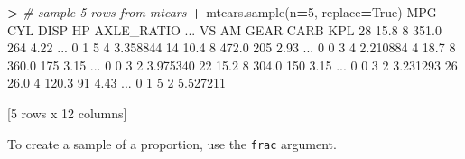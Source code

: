 \documentclass[
]{book}
\newenvironment{Shaded}{\begin{snugshade}}{\end{snugshade}}
\newcommand{\CommentTok}[1]{\textcolor[rgb]{0.56,0.35,0.01}{\textit{#1}}}
\newcommand{\DecValTok}[1]{\textcolor[rgb]{0.00,0.00,0.81}{#1}}
\newcommand{\FloatTok}[1]{\textcolor[rgb]{0.00,0.00,0.81}{#1}}
\newcommand{\NormalTok}[1]{#1}
\newcommand{\OperatorTok}[1]{\textcolor[rgb]{0.81,0.36,0.00}{\textbf{#1}}}
\newcommand{\VariableTok}[1]{\textcolor[rgb]{0.00,0.00,0.00}{#1}}
\begin{document}
\begin{Shaded}
\begin{Highlighting}[]
\OperatorTok{\textgreater{}} \CommentTok{\# sample 5 rows from mtcars}
\OperatorTok{+}\NormalTok{ mtcars.sample(n}\OperatorTok{=}\DecValTok{5}\NormalTok{, replace}\OperatorTok{=}\VariableTok{True}\NormalTok{)}
\NormalTok{     MPG  CYL   DISP   HP  AXLE\_RATIO  ...  VS  AM  GEAR CARB       KPL}
\DecValTok{28}  \FloatTok{15.8}    \DecValTok{8}  \FloatTok{351.0}  \DecValTok{264}        \FloatTok{4.22}\NormalTok{  ...   }\DecValTok{0}   \DecValTok{1}     \DecValTok{5}    \DecValTok{4}  \FloatTok{3.358844}
\DecValTok{14}  \FloatTok{10.4}    \DecValTok{8}  \FloatTok{472.0}  \DecValTok{205}        \FloatTok{2.93}\NormalTok{  ...   }\DecValTok{0}   \DecValTok{0}     \DecValTok{3}    \DecValTok{4}  \FloatTok{2.210884}
\DecValTok{4}   \FloatTok{18.7}    \DecValTok{8}  \FloatTok{360.0}  \DecValTok{175}        \FloatTok{3.15}\NormalTok{  ...   }\DecValTok{0}   \DecValTok{0}     \DecValTok{3}    \DecValTok{2}  \FloatTok{3.975340}
\DecValTok{22}  \FloatTok{15.2}    \DecValTok{8}  \FloatTok{304.0}  \DecValTok{150}        \FloatTok{3.15}\NormalTok{  ...   }\DecValTok{0}   \DecValTok{0}     \DecValTok{3}    \DecValTok{2}  \FloatTok{3.231293}
\DecValTok{26}  \FloatTok{26.0}    \DecValTok{4}  \FloatTok{120.3}   \DecValTok{91}        \FloatTok{4.43}\NormalTok{  ...   }\DecValTok{0}   \DecValTok{1}     \DecValTok{5}    \DecValTok{2}  \FloatTok{5.527211}

\NormalTok{[}\DecValTok{5}\NormalTok{ rows x }\DecValTok{12}\NormalTok{ columns]}
\end{Highlighting}
\end{Shaded}

To create a sample of a proportion, use the \texttt{frac} argument.
\end{document}
